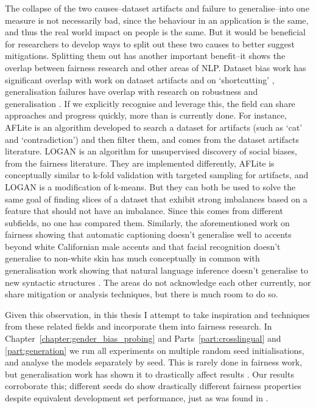 The collapse of the two causes--dataset artifacts and failure to generalise--into one measure is not necessarily bad, since the behaviour in an application is the same, and thus the real world impact on people is the same. But it would be beneficial for researchers to develop ways to split out these two causes to better suggest mitigations. Splitting them out has another important benefit--it shows the overlap between fairness research and other areas of NLP.  Dataset bias work has significant overlap with work on dataset artifacts and on `shortcutting' \citep{geirhos2020shortcut}, generalisation failures have overlap with research on robustness and generalisation \citep{}. If we explicitly recognise and leverage this, the field can share approaches and progress quickly, more than is currently done. For instance, AFLite is an algorithm developed to search a dataset for artifacts (such as `cat' and `contradiction') \citep{LeBras2020AdversarialFO} and then filter them, and comes from the dataset artifacts literature. LOGAN \citep{zhao-chang-2020-logan} is an algorithm for unsupervised discovery of social biases, from the fairness literature. They are implemented differently, AFLite is conceptually similar to k-fold validation with targeted sampling for artifacts, and LOGAN is a modification of k-means. But they can both be used to solve the same goal of finding slices of a dataset that exhibit strong imbalances based on a feature that should not have an imbalance. Since this comes from different subfields, no one has compared them. Similarly, the aforementioned work on fairness showing that automatic captioning doesn't generalise well to accents beyond white Californian male accents \citep{tatman17_interspeech} and that facial recognition doesn't generalise to non-white skin \citep{buolamwini18a} has much conceptually in common with generalisation work showing that natural language inference doesn't generalise to new syntactic structures \citep{mccoy-etal-2020-berts}. The areas do not acknowledge each other currently, nor share mitigation or analysis techniques, but there is much room to do so.

Given this observation, in this thesis I attempt to take inspiration and techniques from these related fields and incorporate them into fairness research. In Chapter~\ref{chapter:gender_bias_probing} and Parts~\ref{part:crosslingual} and \ref{part:generation} we run all experiments on multiple random seed initialisations, and analyse the models separately by seed. This is rarely done in fairness work, but generalisation work has shown it to drastically affect results \citep{mccoy-etal-2020-berts, multiberts}. Our results corroborate this; different seeds do show drastically different fairness properties despite equivalent development set performance, just as was found in \citet{mccoy-etal-2020-berts}.

